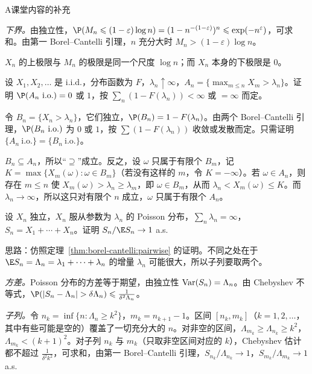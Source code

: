 \begin{exercises}{A}{课堂内容的补充}
\begin{questions}
\begin{solution}
\emph{下界。}由独立性，$\P(M_n\leqslant(1-\varepsilon)\log n)=(1-n^{-(1-\varepsilon)})^n\leqslant\exp(-n^\varepsilon)$，可求和。由第一 Borel--Cantelli 引理，$n$ 充分大时 $M_n>(1-\varepsilon)\log n$。

$X_n$ 的上极限与 $M_n$ 的极限是同一个尺度 $\log n$；而 $X_n$ 本身的下极限是 $0$。
\end{solution}
\end{questions}

\item\label{ex:borel-cantelli:A11} 设 $X_1,X_2,\dots$ 是 i.i.d.，分布函数为 $F$，$\lambda_n\uparrow\infty$，$A_n=\{\max_{m\leqslant n}X_m>\lambda_n\}$。证明 $\P(A_n\ \text{i.o.})=0$ 或 $1$，按 $\sum_n(1-F(\lambda_n))<\infty$ 或 $=\infty$ 而定。
\begin{solution}
令 $B_n=\{X_n>\lambda_n\}$，它们独立，$\P(B_n)=1-F(\lambda_n)$。由两个 Borel--Cantelli 引理，$\P(B_n\ \text{i.o.})$ 为 $0$ 或 $1$，按 $\sum(1-F(\lambda_n))$ 收敛或发散而定。只需证明 $\{A_n\ \text{i.o.}\}=\{B_n\ \text{i.o.}\}$。

$B_n\subseteq A_n$，所以“$\supseteq$”成立。反之，设 $\omega$ 只属于有限个 $B_m$，记 $K=\max\{X_m(\omega):\omega\in B_m\}$（若没有这样的 $m$，令 $K=-\infty$）。若 $\omega\in A_n$，则存在 $m\leqslant n$ 使 $X_m(\omega)>\lambda_n\geqslant\lambda_m$，即 $\omega\in B_m$，从而 $\lambda_n<X_m(\omega)\leqslant K$。而 $\lambda_n\to\infty$，所以这只对有限个 $n$ 成立，$\omega$ 只属于有限个 $A_n$。
\end{solution}

\item\label{ex:borel-cantelli:A12} 设 $X_n$ 独立，$X_n$ 服从参数为 $\lambda_n$ 的 Poisson 分布，$\sum_n\lambda_n=\infty$，$S_n=X_1+\cdots+X_n$。证明 $S_n/\E S_n\to1$ a.s.
\begin{solution}
思路：仿照定理~\ref{thm:borel-cantelli:pairwise} 的证明。不同之处在于 $\E S_n=\Lambda_n=\lambda_1+\cdots+\lambda_n$ 的增量 $\lambda_n$ 可能很大，所以子列要取两个。

\emph{方差。}Poisson 分布的方差等于期望，由独立性 $\operatorname{Var}(S_n)=\Lambda_n$。由 Chebyshev 不等式，$\P(\abs{S_n-\Lambda_n}>\delta\Lambda_n)\leqslant\frac1{\delta^2\Lambda_n}$。

\emph{子列。}令 $n_k=\inf\{n:\Lambda_n\geqslant k^2\}$，$m_k=n_{k+1}-1$。区间 $[n_k,m_k]$（$k=1,2,\dots$，其中有些可能是空的）覆盖了一切充分大的 $n$。对非空的区间，$\Lambda_{m_k}\geqslant\Lambda_{n_k}\geqslant k^2$，$\Lambda_{m_k}<(k+1)^2$。对子列 $n_k$ 与 $m_k$（只取非空区间对应的 $k$），Chebyshev 估计都不超过 $\frac1{\delta^2k^2}$，可求和，由第一 Borel--Cantelli 引理，$S_{n_k}/\Lambda_{n_k}\to1$，$S_{m_k}/\Lambda_{m_k}\to1$ a.s.


\end{solution}
\end{exercises}
